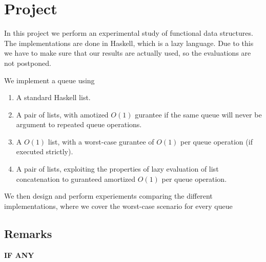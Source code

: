\section*{Project}
In this project we perform an experimental study of functional data structures. The implementations are done in Haskell, which is a lazy language. Due to this we have to make sure that our results are actually used, so the evaluations are not postponed.

We implement a queue using
\begin{enumerate}
 \item A standard Haskell list.
 \item A pair of lists, with amotized $O(1)$ gurantee if the same queue will never be argument to repeated queue operations.
 \item A $O(1)$ list, with a worst-case gurantee of $O(1)$ per queue operation (if executed strictly).
 \item A pair of lists, exploiting the properties of lazy evaluation of list concatenation to guranteed amortized $O(1)$ per queue operation.
\end{enumerate}

We then design and perform experiements comparing the different implementations, where we cover the worst-case scenario for every queue

\subsection*{Remarks}
\textbf{IF ANY}